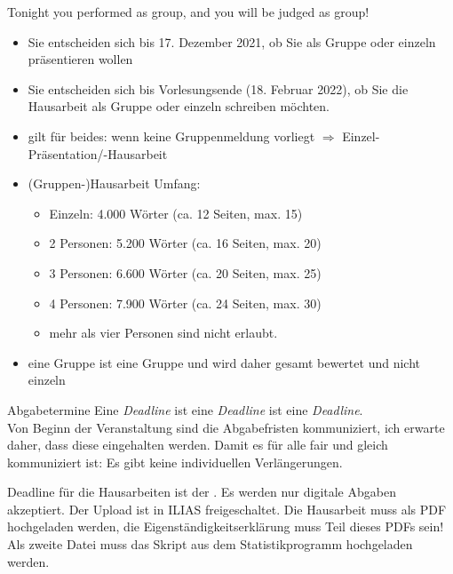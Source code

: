 \documentclass[11pt]{beamer}
\begin{document}
\begin{frame}[t]{Tonight you performed as group, and you will be judged as group!}
	\begin{itemize}
		\item Sie entscheiden sich bis 17. Dezember 2021, ob Sie als Gruppe oder einzeln präsentieren wollen
		\item Sie entscheiden sich bis Vorlesungsende (18. Februar 2022), ob Sie die Hausarbeit als Gruppe oder einzeln schreiben möchten. 
		\item gilt für beides: wenn keine Gruppenmeldung vorliegt $\Rightarrow$ Einzel-Präsentation/-Hausarbeit
		\item (Gruppen-)Hausarbeit Umfang:
			\begin{itemize}
				\item Einzeln: 4.000 Wörter (ca. 12 Seiten, max. 15)
				\item 2 Personen: 5.200 Wörter (ca. 16 Seiten, max. 20)
				\item 3 Personen: 6.600 Wörter (ca. 20 Seiten, max. 25)
				\item 4 Personen: 7.900 Wörter (ca. 24 Seiten, max. 30)
				\item mehr als vier Personen sind nicht erlaubt. 
			\end{itemize}
		\item eine Gruppe ist eine Gruppe und wird daher gesamt bewertet und nicht einzeln
	\end{itemize}
\end{frame}

\begin{frame}[t]{Abgabetermine}
Eine \textit{Deadline} ist eine \textit{Deadline} ist eine \textit{Deadline}. \\

Von Beginn der Veranstaltung sind die Abgabefristen kommuniziert, ich erwarte daher, dass diese eingehalten werden. Damit es für alle fair und gleich kommuniziert ist: Es gibt keine individuellen Verlängerungen.

Deadline für die Hausarbeiten ist der . Es werden nur digitale Abgaben akzeptiert. Der Upload ist in ILIAS freigeschaltet. Die Hausarbeit muss als PDF hochgeladen werden, die Eigenständigkeitserklärung muss Teil dieses PDFs sein! Als zweite Datei muss das Skript aus dem Statistikprogramm hochgeladen werden. 

\end{frame}
\end{document}
